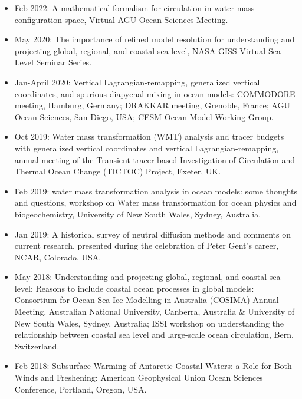 \documentclass{article}
\begin{document}
\begin{itemize}[leftmargin=*]

\item Feb 2022: {\sc A mathematical formalism for circulation in water mass configuration space}, Virtual AGU Ocean Sciences Meeting.

\item May 2020: {\sc The importance of refined model resolution for understanding and projecting global, regional, and coastal sea level}, NASA GISS Virtual Sea Level Seminar Series. 

\item Jan-April 2020: {\sc Vertical Lagrangian-remapping, generalized vertical coordinates, and spurious diapycnal mixing in ocean
  models}: COMMODORE meeting, Hamburg, Germany; DRAKKAR meeting, Grenoble, France; AGU Ocean Sciences, San Diego, USA; CESM Ocean Model Working Group.  

\item Oct 2019: {\sc Water mass transformation (WMT) analysis
  and tracer budgets with generalized vertical coordinates and vertical Lagrangian-remapping}, annual meeting of the Transient tracer-based Investigation of Circulation and Thermal Ocean Change (TICTOC) Project, Exeter, UK.

\item Feb 2019: {\sc water mass transformation analysis in ocean models: some thoughts and questions}, workshop on Water mass transformation for ocean physics and biogeochemistry, University of New South Wales, Sydney, Australia.  

\item Jan 2019: {\sc A historical survey of neutral diffusion methods and comments on current research}, presented during the celebration of Peter Gent's career, NCAR, Colorado, USA.  

\item May 2018: {\sc Understanding and projecting global, regional, and coastal sea level: Reasons to include coastal ocean processes in global models}: Consortium for Ocean-Sea Ice Modelling in Australia (COSIMA) Annual Meeting, Australian National University, Canberra, Australia \& University of New South Wales, Sydney, Australia; ISSI workshop on understanding the relationship between coastal sea level and large-scale ocean circulation, Bern, Switzerland. 

\item Feb 2018: {\sc Subsurface Warming of Antarctic Coastal Waters: a Role for Both Winds and Freshening}: {\sc American Geophysical Union Ocean Sciences Conference}, Portland, Oregon, USA.


\end{itemize}
\end{document}
